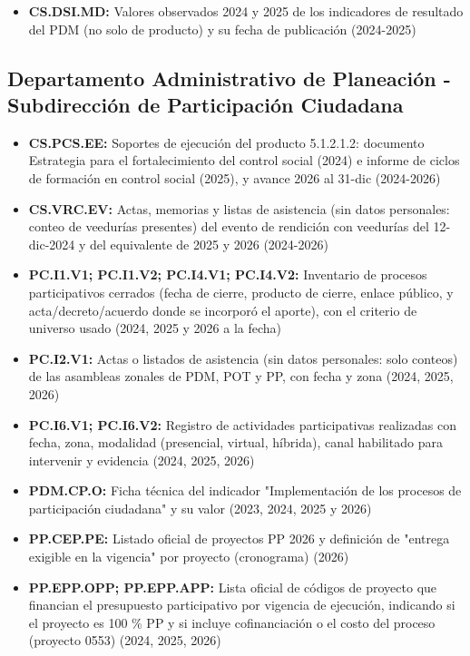 \documentclass[11pt,letterpaper]{article}
\begin{document}
\begin{itemize}

\item \textbf{CS.DSI.MD:} Valores observados 2024 y 2025 de los indicadores de resultado del PDM (no solo de producto) y su fecha de publicación (2024-2025)

\end{itemize}

\subsection*{Departamento Administrativo de Planeación - Subdirección de Participación Ciudadana}

\begin{itemize}

\item \textbf{CS.PCS.EE:} Soportes de ejecución del producto 5.1.2.1.2: documento Estrategia para el fortalecimiento del control social (2024) e informe de ciclos de formación en control social (2025), y avance 2026 al 31-dic (2024-2026)

\item \textbf{CS.VRC.EV:} Actas, memorias y listas de asistencia (sin datos personales: conteo de veedurías presentes) del evento de rendición con veedurías del 12-dic-2024 y del equivalente de 2025 y 2026 (2024-2026)

\item \textbf{PC.I1.V1; PC.I1.V2; PC.I4.V1; PC.I4.V2:} Inventario de procesos participativos cerrados (fecha de cierre, producto de cierre, enlace público, y acta/decreto/acuerdo donde se incorporó el aporte), con el criterio de universo usado (2024, 2025 y 2026 a la fecha)

\item \textbf{PC.I2.V1:} Actas o listados de asistencia (sin datos personales: solo conteos) de las asambleas zonales de PDM, POT y PP, con fecha y zona (2024, 2025, 2026)

\item \textbf{PC.I6.V1; PC.I6.V2:} Registro de actividades participativas realizadas con fecha, zona, modalidad (presencial, virtual, híbrida), canal habilitado para intervenir y evidencia (2024, 2025, 2026)

\item \textbf{PDM.CP.O:} Ficha técnica del indicador "Implementación de los procesos de participación ciudadana" y su valor (2023, 2024, 2025 y 2026)

\item \textbf{PP.CEP.PE:} Listado oficial de proyectos PP 2026 y definición de "entrega exigible en la vigencia" por proyecto (cronograma) (2026)

\item \textbf{PP.EPP.OPP; PP.EPP.APP:} Lista oficial de códigos de proyecto que financian el presupuesto participativo por vigencia de ejecución, indicando si el proyecto es 100 \% PP y si incluye cofinanciación o el costo del proceso (proyecto 0553) (2024, 2025, 2026)

\end{itemize}
\end{document}
